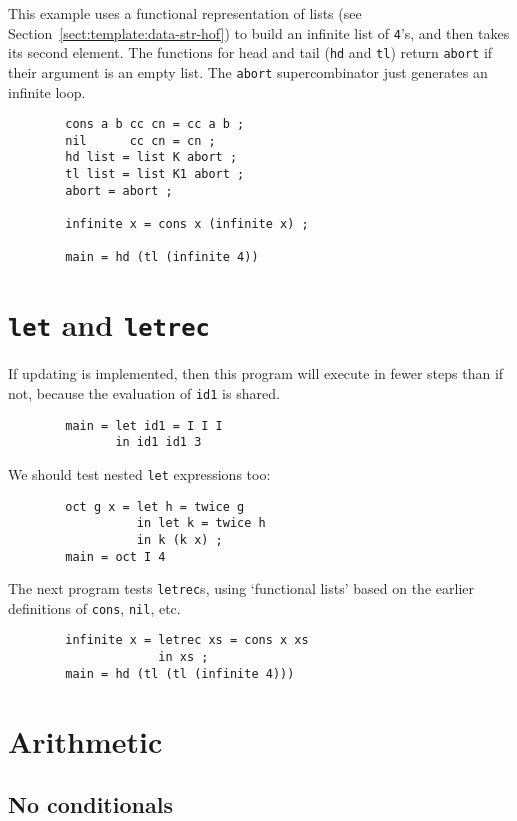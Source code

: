 This example uses a functional representation of lists
(see Section~\ref{sect:template:data-str-hof}) to build an infinite
list of \mbox{\tt 4}'s, and then takes its second element.  The functions for
head and tail (\mbox{\tt hd} and \mbox{\tt tl}) return \mbox{\tt abort} if their argument is an empty
list.  The \mbox{\tt abort} supercombinator just generates an infinite loop.
\begin{verbatim}
        cons a b cc cn = cc a b ;
        nil      cc cn = cn ;
        hd list = list K abort ;
        tl list = list K1 abort ;
        abort = abort ;

        infinite x = cons x (infinite x) ;

        main = hd (tl (infinite 4))
\end{verbatim}

\section{\mbox{\tt let} and \mbox{\tt letrec}}

If updating is implemented, then this program will execute in fewer steps
than if not, because the evaluation of \mbox{\tt id1} is shared.
\begin{verbatim}
        main = let id1 = I I I
               in id1 id1 3
\end{verbatim}
We should test nested \mbox{\tt let} expressions too:
\begin{verbatim}
        oct g x = let h = twice g
                  in let k = twice h
                  in k (k x) ;
        main = oct I 4
\end{verbatim}
The next program tests \mbox{\tt letrec}s, using `functional lists' based on
the earlier definitions of \mbox{\tt cons}, \mbox{\tt nil}, etc.
\begin{verbatim}
        infinite x = letrec xs = cons x xs
                     in xs ;
        main = hd (tl (tl (infinite 4)))
\end{verbatim}

\section{Arithmetic}

\subsection{No conditionals}

